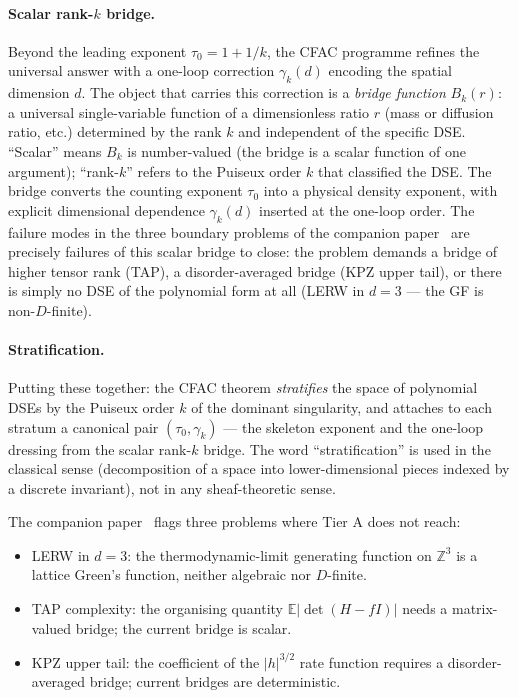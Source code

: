 \documentclass[10pt,a4paper,twocolumn]{article}
\theoremstyle{plain}
\theoremstyle{definition}
\newcommand{\Ex}{\mathbb{E}}
\begin{document}
\paragraph{Scalar rank-$k$ bridge.}
Beyond the leading exponent $\tau_0 = 1 + 1/k$, the CFAC
programme refines the universal answer with a one-loop correction
$\gamma_k(d)$ encoding the spatial dimension $d$.  The object
that carries this correction is a \emph{bridge function}
$B_k(r)$: a universal single-variable function of a dimensionless
ratio $r$ (mass or diffusion ratio, etc.) determined by the rank
$k$ and independent of the specific DSE.  ``Scalar'' means $B_k$
is number-valued (the bridge is a scalar function of one
argument); ``rank-$k$'' refers to the Puiseux order $k$ that
classified the DSE.  The bridge converts the counting exponent
$\tau_0$ into a physical density exponent, with explicit
dimensional dependence $\gamma_k(d)$ inserted at the one-loop
order.  The failure modes in the three boundary problems of the
companion paper~\citep{AmarteifioMannaC3} are precisely failures
of this scalar bridge to close: the problem demands a bridge of
higher tensor rank (TAP), a disorder-averaged bridge (KPZ upper
tail), or there is simply no DSE of the polynomial form at all
(LERW in $d = 3$ --- the GF is non-$D$-finite).

\paragraph{Stratification.}
Putting these together: the CFAC theorem \emph{stratifies} the
space of polynomial DSEs by the Puiseux order $k$ of the dominant
singularity, and attaches to each stratum a canonical pair
$(\tau_0, \gamma_k)$ --- the skeleton exponent and the one-loop
dressing from the scalar rank-$k$ bridge.  The word
``stratification'' is used in the classical sense (decomposition
of a space into lower-dimensional pieces indexed by a discrete
invariant), not in any sheaf-theoretic sense.

\medskip

The companion paper~\citep{AmarteifioMannaC3} flags three problems
where Tier A does not reach:

\begin{itemize}[leftmargin=*]
\item LERW in $d = 3$: the thermodynamic-limit generating function on
  $\mathbb{Z}^3$ is a lattice Green's function, neither algebraic nor
  $D$-finite.
\item TAP complexity: the organising quantity $\Ex|\det(H - fI)|$
  needs a matrix-valued bridge; the current bridge is scalar.
\item KPZ upper tail: the coefficient of the $|h|^{3/2}$ rate
  function requires a disorder-averaged bridge; current bridges are
  deterministic.
\end{itemize}
\end{document}
